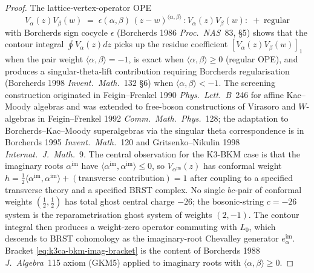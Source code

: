 \begin{proof}
The lattice-vertex-operator OPE
\[
 V_\alpha(z)V_\beta(w)
 \;=\;
 \epsilon(\alpha,\beta)\,(z-w)^{\langle\alpha,\beta\rangle}\,
 {:}V_\alpha(z)V_\beta(w){:}\;+\;\text{regular}
\]
with Borcherds sign cocycle $\epsilon$
(Borcherds 1986 \emph{Proc.\ NAS}~83, \S5) shows that the contour
integral $\oint V_\alpha(z)dz$ picks up the residue coefficient
$[V_\alpha(z)V_\beta(w)]_1$ when the pair weight
$\langle\alpha,\beta\rangle = -1$, is exact when
$\langle\alpha,\beta\rangle \geq 0$ (regular OPE), and produces a
singular-theta-lift contribution requiring Borcherds regularisation
(Borcherds 1998 \emph{Invent.\ Math.}~132 \S6) when
$\langle\alpha,\beta\rangle < -1$. The screening construction
originated in Feigin--Frenkel 1990 \emph{Phys.\ Lett.\ B}~246 for
affine Kac--Moody algebras and was extended to free-boson
constructions of Virasoro and $W$-algebras in Feigin--Frenkel 1992
\emph{Comm.\ Math.\ Phys.}~128; the adaptation to Borcherds--Kac--Moody
superalgebras via the singular theta correspondence is in
Borcherds 1995 \emph{Invent.\ Math.}~120 and Gritsenko--Nikulin 1998
\emph{Internat.\ J.\ Math.}~9.
The central observation for the K3-BKM case is that the imaginary
roots $\alpha^{\mathrm{im}}$ have $\langle\alpha^{\mathrm{im}},\alpha^{\mathrm{im}}\rangle\leq 0$,
so $V_{\alpha^{\mathrm{im}}}(z)$ has conformal weight
$h = \tfrac{1}{2}\langle\alpha^{\mathrm{im}},\alpha^{\mathrm{im}}\rangle + (\text{transverse contribution}) = 1$
after coupling to a specified transverse theory and a specified BRST
complex. No single \(bc\)-pair of conformal weights
\((\tfrac12,\tfrac12)\) has total ghost central charge \(-26\);
the bosonic-string \(c=-26\) system is the reparametrisation ghost
system of weights \((2,-1)\).
The contour integral then produces a weight-zero operator
commuting with $L_0$, which descends to BRST cohomology as the
imaginary-root Chevalley generator $e^{\mathrm{im}}_\alpha$. Bracket
\eqref{eq:k3ca-bkm-imag-bracket} is the content of Borcherds 1988
\emph{J.\ Algebra}~115 axiom (GKM5) applied to imaginary roots
with $\langle\alpha,\beta\rangle\geq 0$.
\end{proof}


